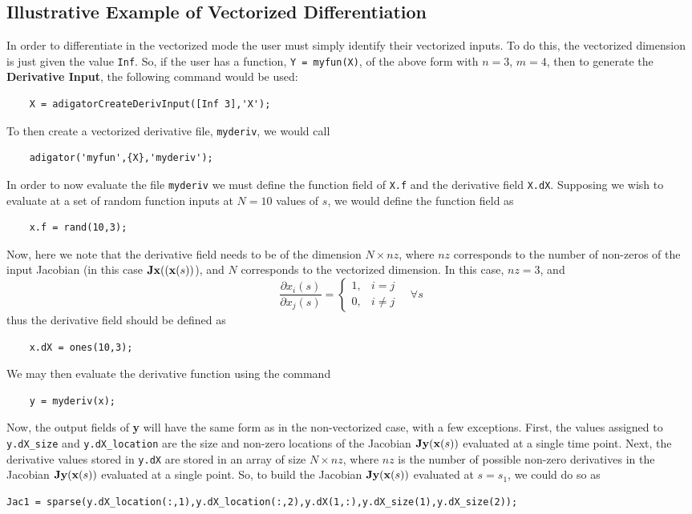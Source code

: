 \documentclass[10pt,pdftex]{article}
\begin{document}
\subsection{Illustrative Example of Vectorized Differentiation}
In order to differentiate in the vectorized mode the user must simply identify their vectorized inputs. To do this, the vectorized dimension is just given the value \texttt{Inf}. So, if the user has a function, \texttt{Y = myfun(X)}, of the above form with $n = 3$, $m = 4$, then to generate the {\bf Derivative Input}, the following command would be used:
\begin{verbatim}
    X = adigatorCreateDerivInput([Inf 3],'X');
\end{verbatim}
To then create a vectorized derivative file, \texttt{myderiv}, we would call
\begin{verbatim}
    adigator('myfun',{X},'myderiv');
\end{verbatim}
In order to now evaluate the file \texttt{myderiv} we must define the function field of \texttt{X.f} and the derivative field \texttt{X.dX}. Supposing we wish to evaluate at a set of random function inputs at $N =10$ values of $s$, we would define the function field as
\begin{verbatim}
    x.f = rand(10,3);
\end{verbatim}
Now, here we note that the derivative field needs to be of the dimension $N \times nz$, where $nz$ corresponds to the number of non-zeros of the input Jacobian (in this case $\mathbf{J}\mathbf{x}((\mathbf{x}(s))$), and $N$ corresponds to the vectorized dimension. In this case, $nz = 3$, and
\begin{equation}
\frac{\partial x_i(s)}{\partial x_j(s)} = \left\{ \begin{array}{cl}
1, & i = j\\
0, & i \neq j
\end{array}\right.
\quad \forall s
\end{equation}
thus the derivative field should be defined as
\begin{verbatim}
    x.dX = ones(10,3);
\end{verbatim}
We may then evaluate the derivative function using the command
\begin{verbatim}
    y = myderiv(x);
\end{verbatim}
Now, the output fields of \textbf{y} will have the same form as in the non-vectorized case, with a few exceptions. First, the values assigned to \texttt{y.dX\_size}  and \texttt{y.dX\_location} are the size and non-zero locations of the Jacobian $\mathbf{J}\mathbf{y}(\mathbf{x}(s))$ evaluated at a single time point. Next, the derivative values stored in \texttt{y.dX} are stored in an array of size $N \times nz$, where $nz$ is the number of possible non-zero derivatives in the Jacobian $\mathbf{J}\mathbf{y}(\mathbf{x}(s))$ evaluated at a single point. So, to build the Jacobian $\mathbf{J}\mathbf{y}(\mathbf{x}(s))$ evaluated at $s = s_1$, we could do so as
\begin{verbatim}
Jac1 = sparse(y.dX_location(:,1),y.dX_location(:,2),y.dX(1,:),y.dX_size(1),y.dX_size(2));
\end{verbatim}
\end{document}
